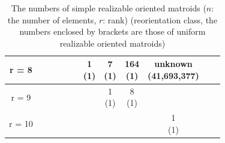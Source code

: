 \documentclass{article}
\begin{document}
\begin{table}[h]
\begin{center}
{\begin{tabular}{c | c | c | c | c | c | c | c | c | c | c | c |}
 \hline
 r = 8  &       &       &        &   &      & \shortstack{1 \\ (1)}   & \shortstack{7 \\ (1)} & \shortstack{164 \\ (1)} & \shortstack{unknown \\ (41,693,377)}\\
 \hline
 r = 9  &       &       &        &    &     &   & \shortstack{1 \\ (1)} & \shortstack{8 \\ (1)} & \\
 \hline
 r = 10  &       &       &        &     &      &  &  & & \shortstack{1 \\ (1)} \\
 \hline
\end{tabular}
}
\end{center}
\caption{The numbers of simple realizable oriented matroids ($n$: the number of elements, $r$: rank)
(reorientation class, the numbers enclosed by brackets are those of uniform realizable oriented matroids) \cite{AAK02,AK06,BRG90,C71,GSL89,G03,G72,H71,R88}}
\label{existing1_realizable}
\end{table}
\end{document}
